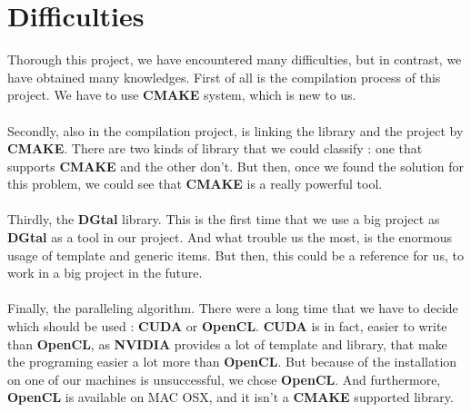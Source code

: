 \section{Difficulties}

Thorough this project, we have encountered many difficulties, but in contrast, we have obtained many knowledges. First of all is the compilation process of this project. We have to use \textbf{CMAKE} system, which is new to us. 

\paragraph{}
Secondly, also in the compilation project, is linking the library and the project by \textbf{CMAKE}. There are two kinds of library that we could classify : one that supports \textbf{CMAKE} and the other don't. But then, once we found the solution for this problem, we could see that \textbf{CMAKE} is a really powerful tool. 

\paragraph{}
Thirdly, the \textbf{DGtal} library. This is the first time that we use a big project as \textbf{DGtal} as a tool in our project. And what trouble us the most, is  the enormous usage of template and generic items. But then, this could be a reference for us, to work in a big project in the future. 

\paragraph{}
Finally, the paralleling algorithm. There were a long time that we have to decide  which should be used : \textbf{CUDA} or \textbf{OpenCL}. \textbf{CUDA} is in fact, easier to write than \textbf{OpenCL}, as \textbf{NVIDIA} provides a lot of template and library, that make the programing easier a lot more than \textbf{OpenCL}. But because of the installation on one of our machines is unsuccessful, we chose \textbf{OpenCL}. And furthermore, \textbf{OpenCL} is available on MAC OSX, and it isn't a \textbf{CMAKE} supported library.
